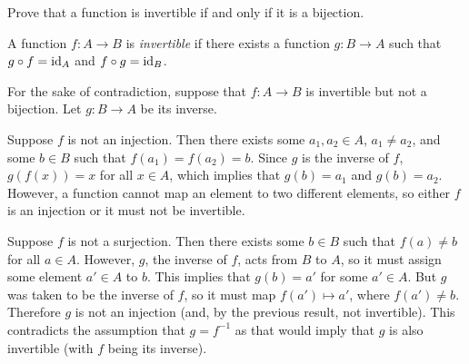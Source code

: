 \begin{problem}
  Prove that a function is invertible if and only if it is a bijection.
\end{problem}

\begin{answer}
  \begin{definition}
    A function $f : A \to B$ is \emph{invertible} if there exists a function
    $g : B \to A$ such that $g \circ f = \operatorname{id}_A$ and $f \circ g = \operatorname{id}_B$.
  \end{definition}

  \step
  For the sake of contradiction, suppose that $f : A \to B$ is invertible
  but not a bijection. Let $g : B \to A$ be its inverse.
   \begin{enumroman}
    \item Suppose $f$ is not an injection.
      Then there exists some $a_1, a_2 \in A$,
      $a_1 \neq a_2$, and some $b \in B$ such that $f(a_1) = f(a_2) = b$.
      Since $g$ is the inverse of $f$, $g(f(x)) = x$ for all $x \in A$,
      which implies that $g(b) = a_1$ and $g(b) = a_2$.
      However, a function cannot map an element to two different elements,
      so either $f$ is an injection or it must not be invertible.

    \item Suppose $f$ is not a surjection.
      Then there exists some $b \in B$ such that 
      $f(a) \neq b$ for all $a \in A$.
      However, $g$, the inverse of $f$, acts from $B$ to $A$,
      so it must assign some element $a' \in A$ to $b$.
      This implies that $g(b) = a'$ for some $a' \in A$.
      But $g$ was taken to be the inverse of $f$, so it must map
      $f(a') \mapsto a'$, where $f(a') \neq b$.
      Therefore $g$ is not an injection (and, by the previous result,
      not invertible). This contradicts the assumption that $g = f^{-1}$
      as that would imply that $g$ is also invertible (with $f$ being its inverse).
    
   \end{enumroman}


\end{answer}
